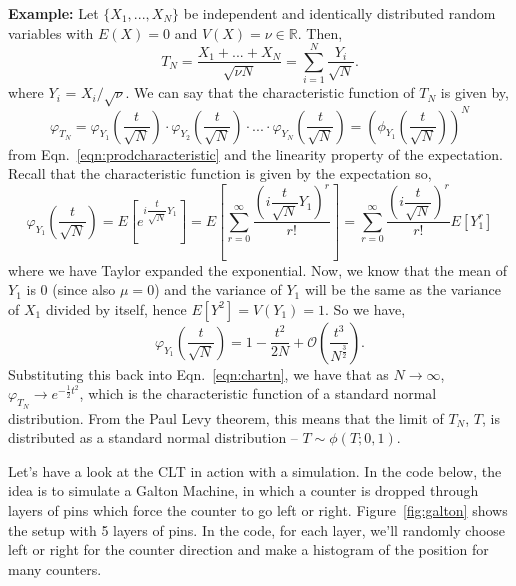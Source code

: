 \begin{tcolorbox}[colback=backblue]
\textbf{Example:} Let $\{X_{1},...,X_{N}\}$ be independent and identically distributed random variables with $E(X)=0$ and $V(X)=\nu\in\mathbb{R}$. Then, 
\begin{equation}
    T_{N} = \frac{X_{1}+...+X_{N}}{\sqrt{\nu N}} = \sum_{i=1}^{N}\frac{Y_{i}}{\sqrt{N}}.
\end{equation}
where $Y_{i}$ = $X_{i}/\sqrt{\nu}$. We can say that the characteristic function of $T_{N}$ is given by, 
\begin{equation}\label{eqn:chartn}
    \varphi_{T_{N}} = \varphi_{Y_{1}}\left(\frac{t}{\sqrt{N}}\right)\cdot \varphi_{Y_{2}}\left(\frac{t}{\sqrt{N}}\right)\cdot...\cdot\varphi_{Y_{N}}\left(\frac{t}{\sqrt{N}}\right) = \left(\phi_{Y_{1}}\left(\frac{t}{\sqrt{N}}\right)\right)^N
\end{equation}
from Eqn.~\ref{eqn:prodcharacteristic} and the linearity property of the expectation. Recall that the characteristic function is given by the expectation so, 
\begin{equation}
    \varphi_{Y_{1}}\left(\frac{t}{\sqrt{N}}\right) = E\left[e^{i\dfrac{t}{\sqrt{N}}Y_{1}}\right] = E\left[ \sum_{r=0}^{\infty}\dfrac{\left(i\dfrac{t}{\sqrt{N}}Y_1\right)^{r}}{r!} \right] = \sum_{r=0}^{\infty}\dfrac{\left(i\dfrac{t}{\sqrt{N}}\right)^{r}}{r!}E\left[Y_1^{r}\right]
\end{equation}
where we have Taylor expanded the exponential. Now, we know that the mean of $Y_{1}$ is 0 (since also $\mu=0$) and the variance of $Y_{1}$ will be the same as the variance of $X_{1}$ divided by itself, hence $E\left[Y^{2}\right] = V(Y_1)=1$. So we have, 
\begin{equation}
    \varphi_{Y_{1}}\left(\frac{t}{\sqrt{N}}\right) = 1 - \dfrac{t^{2}}{2N} + \mathcal{O}\left(\frac{t^{3}}{N^{\frac{3}{2}}} \right).
\end{equation}
Substituting this back into Eqn.~\ref{eqn:chartn}, we have that as $N\rightarrow \infty$, $\varphi_{T_{N}}\rightarrow e^{-\frac{1}{2}t^{2}}$, which is the characteristic function of a standard normal distribution. From the Paul Levy theorem, this means that the limit of $T_N$, $T$, is distributed as a standard normal distribution -- $T\sim \phi(T;0,1)$. 
\end{tcolorbox}

Let's have a look at the CLT in action with a simulation. In the code below, the idea is to simulate a Galton Machine, in which a counter is dropped through layers of pins which force the counter to go left or right. Figure~\ref{fig:galton} shows the setup with 5 layers of pins. In the code, for each layer, we'll randomly choose left or right for the counter direction and make a histogram of the position for many counters. 

